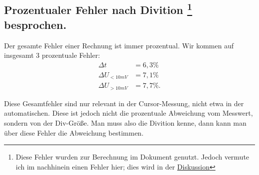 \subsection*{Prozentualer Fehler nach Divition \footnote{Diese Fehler wurden zur Berechnung im Dokument genutzt. Jedoch vermute ich im nachhinein einen Fehler hier; dies wird in der \hyperref[sec:korrektur_des_Fehlers]{Diskussion}} besprochen.}
Der gesamte Fehler einer Rechnung ist immer prozentual. Wir kommen auf insgesamt 3 prozentuale Fehler:
\begin{align}
\Delta t &= 6,3\%\\
\Delta U_{<10mV} &= 7,1\% \\
\Delta U_{>10mV} &= 7,7\%.
\end{align}

Diese Gesamtfehler sind nur relevant in der Cursor-Messung, nicht etwa in der automatischen.
Diese ist jedoch nicht die prozentuale Abweichung vom Messwert, sondern von der Div-Größe. Man muss also die Divition kenne, dann kann man über diese Fehler die Abweichung bestimmen.


\newpage

